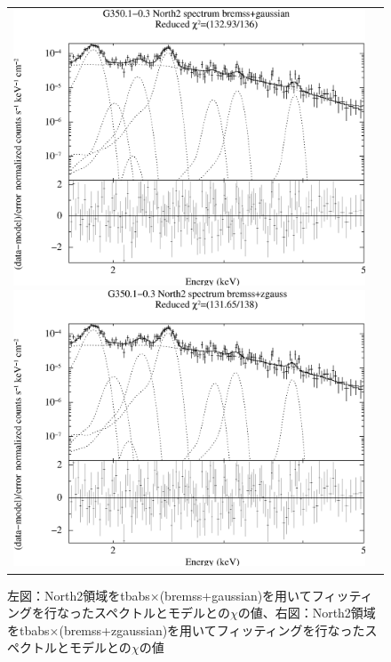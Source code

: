 \documentclass[a4j]{jarticle}%
\begin{document}
\begin{figure}[H]
\begin{center}
\begin{tabular}{cc}

\begin{minipage}{0.5\hsize}
\begin{center}
\includegraphics[scale=0.30]{./ps/North2_bremss+gaussian.eps}
\end{center}
\end{minipage}

\begin{minipage}{0.5\hsize}
\begin{center}
\includegraphics[scale=0.30]{./ps/North2_bremss+zgaussian.eps}
\end{center}
\end{minipage}
\end{tabular}
\caption{左図：North2領域をtbabs$\times$(bremss+gaussian)を用いてフィッティングを行なったスペクトルとモデルとの$\chi$の値、右図：North2領域をtbabs$\times$(bremss+zgaussian)を用いてフィッティングを行なったスペクトルとモデルとの$\chi$の値}
\label{fig:brem_North2}
\end{center}
\end{figure}
\end{document}
